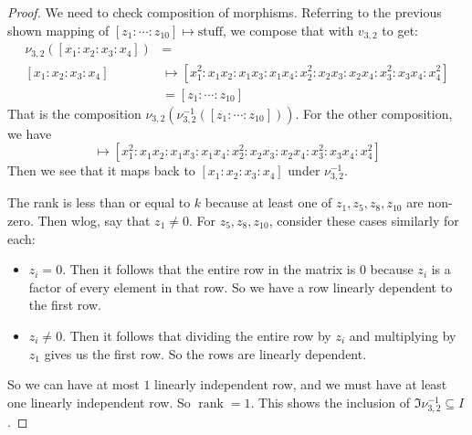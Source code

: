 \documentclass{article}
\begin{document}
\begin{itemize}
\begin{proof}
                We need to check composition of morphisms. Referring to the previous shown mapping of $[z_{1} : \cdots : z_{10}] \mapsto \text{stuff}$, we compose that with $v_{3, 2}$ to get:
                    \begin{align*}
                        \nu_{3, 2}([x_{1} : x_{2} : x_{3} : x_{4}]) &= \\
                        [x_{1} : x_{2} : x_{3} : x_{4}] &\mapsto [x_{1}^{2} : x_{1}x_{2} : x_{1}x_{3} : x_{1}x_{4} : x_{2}^{2} : x_{2}x_{3} : x_{2}x_{4} : x_{3}^{2}: x_{3}x_{4} : x_{4}^{2}] \\
                                                        &= [z_{1} : \cdots : z_{10}]
                    \end{align*}
                That is the composition $\nu_{3, 2}(\nu_{3, 2}^{-1}([z_{1} : \cdots : z_{10}]))$. For the other composition, we have
                    \begin{equation*}
                        [x_{1} : x_{2} : x_{3} : x_{4}] \mapsto [x_{1}^{2} : x_{1}x_{2} : x_{1}x_{3} : x_{1}x_{4} : x_{2}^{2} : x_{2}x_{3} : x_{2}x_{4} : x_{3}^{2}: x_{3}x_{4} : x_{4}^{2}]
                    \end{equation*}
                Then we see that it maps back to $[x_{1} : x_{2} : x_{3} : x_{4}]$ under $\nu_{3, 2}^{-1}$.

                The rank is less than or equal to $k$ because at least one of $z_{1}, z_{5}, z_{8}, z_{10}$ are non-zero. Then wlog, say that $z_{1} \neq 0$. For $z_{5}, z_{8}, z_{10}$, consider these cases similarly for each:
                    \begin{itemize}
                        \item $z_{i} = 0$. Then it follows that the entire row in the matrix is $0$ because $z_{i}$ is a factor of every element in that row. So we have a row linearly dependent to the first row.

                        \item $z_{i} \neq 0$. Then it follows that dividing the entire row by $z_{i}$ and multiplying by $z_{1}$ gives us the first row. So the rows are linearly dependent.
                    \end{itemize}
                So we can have at most $1$ linearly independent row, and we must have at least one linearly independent row. So $\mathop{rank} = 1$. This shows the inclusion of $\Im{\nu_{3, 2}^{-1}} \subseteq I$.
            \end{proof}


\end{itemize}
\end{document}
